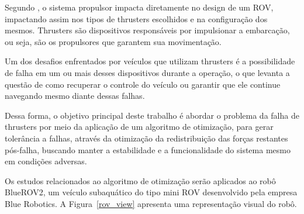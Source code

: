 \documentclass[../main.tex]{subfiles}
\begin{document}
Segundo \textcite{christ2013rov}, o sistema propulsor impacta diretamente no design de um ROV, impactando assim nos tipos de thrusters escolhidos e na configuração dos mesmos. Thrusters são dispositivos responsáveis por impulsionar a embarcação, ou seja, são os propulsores que garantem sua movimentação.

Um dos desafios enfrentados por veículos que utilizam thrusters é a possibilidade de falha em um ou mais desses dispositivos durante a operação, o que levanta a questão de como recuperar o controle do veículo ou garantir que ele continue navegando mesmo diante dessas falhas.

Dessa forma, o objetivo principal deste trabalho é abordar o problema da falha de thrusters por meio da aplicação de um algoritmo de otimização, para gerar tolerância a falhas, através da otimização da redistribuição das forças restantes pós-falha, buscando manter a estabilidade e a funcionalidade do sistema mesmo em condições adversas.

Os estudos relacionados ao algoritmo de otimização serão aplicados ao robô BlueROV2, um veículo subaquático do tipo mini ROV desenvolvido pela empresa Blue Robotics. A Figura~\ref{rov_view} apresenta uma representação visual do robô.
\end{document}
